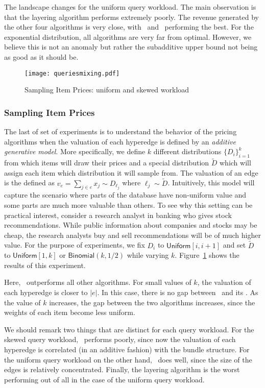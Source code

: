 The landscape changes for the uniform query workload. The main observation is that the layering
algorithm performs extremely poorly. The revenue generated by the other four algorithms is very
close, with \lpip\ and \ubp\ performing the best.  
For the exponential distribution, all algorithms are very far from optimal. However, we believe this is not an anomaly but rather the subadditive upper bound not being as good as it should be.


\begin{figure}[!t]
	\centering
	\texttt{[image: queriesmixing.pdf]}
	\caption{Sampling Item Prices: uniform and skewed workload} \label{fig:mixing}
\end{figure}  

\subsubsection{Sampling Item Prices} The last of set of experiments is to understand the behavior of the pricing algorithms when the valuation of each hyperedge is defined by an \emph{additive generative model}. More specifically, we define $k$ different distributions $\{D_i\}_{i=1}^{k}$ from which items will draw their prices and a special distribution $\tilde{D}$ which will assign each item which distribution it will sample from. The valuation of an edge is the defined as $v_e = \sum_{j \in e} x_j \sim D_{\ell_j}$ where $\ell_j \sim \tilde{D}$. Intuitively, this model will capture the scenario where parts of the database have non-uniform value and some parts are much more valuable than others. To see why this setting can be practical interest, consider a research analyst in banking who gives stock recommendations. While public information about companies and stocks may be cheap, the research analysts buy and sell recommendations will be of much higher value. For the purpose of experiments, we fix $D_i$ to $\textsf{Uniform}[i, i+1]$ and set $\tilde{D}$ to $\textsf{Uniform}[1, k]$ or $\textsf{Binomial}(k, 1/2)$ while varying $k$. Figure~\ref{fig:mixing} shows the results of this experiment. 

Here, \lpip\ outperforms all other algorithms. For small values of $k$, the valuation of each hyperedge is closer to $|e|$. In this case, there is no gap between \uip\ and its \lpip. As the value of $k$ increases, the gap between the two algorithms increases, since the weights of each item become less uniform.
 
We should remark two things that are distinct for each query workload. For the skewed query workload, \ubp\ performs poorly, since now the valuation of each hyperedge is correlated (in an additive fashion) with the bundle structure. For the uniform query workload on the other hand, \ubp\ does well, since   
the size of the edges is relatively concentrated. Finally, the layering algorithm is the worst performing out of all in the case of the uniform query workload.

